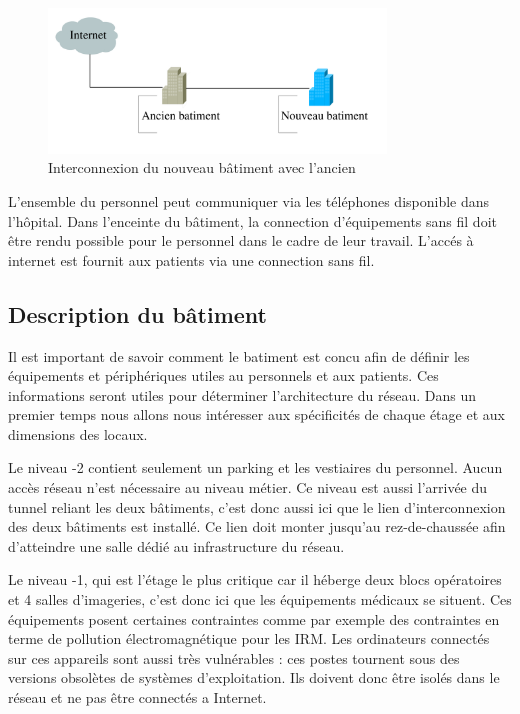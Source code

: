 %

\begin{figure}[!ht]
    \center
    \includegraphics[width=0.8\textwidth]{./images/interco-batiment.png}
    \caption{Interconnexion du nouveau bâtiment avec l'ancien}
\end{figure}

%

L'ensemble du personnel peut communiquer via les téléphones disponible dans l'hôpital.
Dans l'enceinte du bâtiment, la connection d'équipements sans fil doit être rendu possible pour le personnel dans le cadre de leur travail.
L'accés à internet est fournit aux patients via une connection sans fil.


%
%
\subsection{Description du bâtiment}

Il est important de savoir comment le batiment est concu afin de définir les équipements et périphériques utiles au personnels et aux patients.
Ces informations seront utiles pour déterminer l'architecture du réseau.
Dans un premier temps nous allons nous intéresser aux spécificités de chaque étage et aux dimensions des locaux.

%

Le niveau -2 contient seulement un parking et les vestiaires du personnel.
Aucun accès réseau n'est nécessaire au niveau métier.
Ce niveau est aussi l'arrivée du tunnel reliant les deux bâtiments, c'est donc aussi ici que le lien d'interconnexion des deux bâtiments est installé.
Ce lien doit monter jusqu'au rez-de-chaussée afin d'atteindre une salle dédié au infrastructure du réseau.

%

Le niveau -1, qui est l'étage le plus critique car il héberge deux blocs opératoires et 4 salles d'imageries, c'est donc ici que les équipements médicaux se situent.
Ces équipements posent certaines contraintes comme par exemple des contraintes en terme de pollution électromagnétique pour les IRM.
Les ordinateurs connectés sur ces appareils sont aussi très vulnérables : ces postes tournent sous des versions obsolètes de systèmes d'exploitation.
Ils doivent donc être isolés dans le réseau et ne pas être connectés a Internet.

